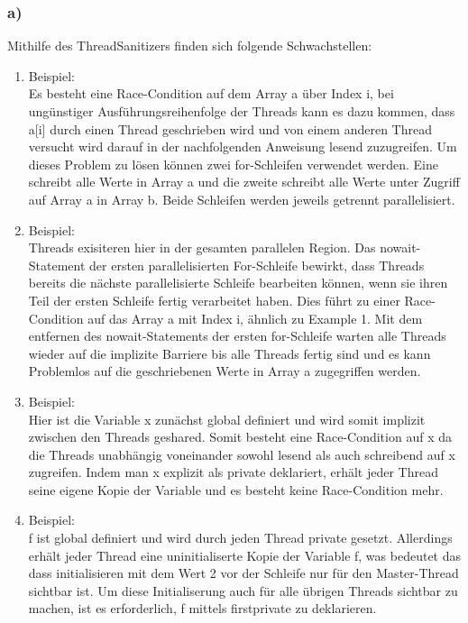 \documentclass{report}
\begin{document}
    	\subsubsection{a)}
    				Mithilfe des ThreadSanitizers finden sich folgende Schwachstellen:
		\begin{enumerate}
			\item Beispiel: \\
				Es besteht eine Race-Condition auf dem Array a über Index i,
				bei ungünstiger Ausführungsreihenfolge der Threads kann es dazu kommen,
				dass a[i] durch einen Thread geschrieben wird und von einem anderen Thread versucht wird darauf in der nachfolgenden Anweisung lesend zuzugreifen.
				Um dieses Problem zu lösen können zwei for-Schleifen verwendet werden.
				Eine schreibt alle Werte in Array a und die zweite schreibt alle Werte unter Zugriff auf Array a in Array b. 
				Beide Schleifen werden jeweils getrennt parallelisiert.
			\item Beispiel: \\
				Threads exisiteren hier in der gesamten parallelen Region.
				Das nowait-Statement der ersten parallelisierten For-Schleife bewirkt, dass Threads bereits die nächste parallelisierte Schleife bearbeiten können, wenn sie ihren Teil der ersten Schleife fertig verarbeitet haben.
				Dies führt zu einer Race-Condition auf das Array a mit Index i, ähnlich zu Example 1.
				Mit dem entfernen des nowait-Statements der ersten for-Schleife warten alle Threads wieder auf die implizite Barriere bis alle Threads fertig sind und es kann Problemlos auf die geschriebenen Werte in Array a zugegriffen werden.
			\item Beispiel: \\
				Hier ist die Variable x zunächst global definiert und wird somit implizit zwischen den Threads geshared. 
				Somit besteht eine Race-Condition auf x da die Threads unabhängig voneinander sowohl lesend als auch schreibend auf x zugreifen.
				Indem man x explizit als private deklariert, erhält jeder Thread seine eigene Kopie der Variable und es besteht keine Race-Condition mehr.
			\item Beispiel: \\
				f ist global definiert und wird durch jeden Thread private gesetzt. 
				Allerdings erhält jeder Thread eine uninitialiserte Kopie der Variable f, was bedeutet das dass initialisieren mit dem Wert 2 vor der Schleife nur für den Master-Thread sichtbar ist.
				Um diese Initialiserung auch für alle übrigen Threads sichtbar zu machen, ist es erforderlich, f mittels firstprivate zu deklarieren.

\end{enumerate}
\end{document}
